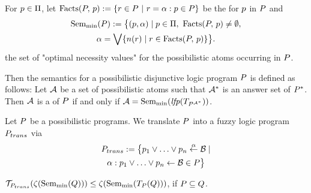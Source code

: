 For $\atom\in\Atoms$, let $\pFacts{\pflp}{\atom}\eqdef\set{\prule\in\pflp \guard \prule = \pnec:\atom \in\pflp}$ be the  for $\atom$ in $\pflp$ and
\begin{multline*}
    \Semmin{\pflp} \eqdef \bigl\{ (\atom,\lelem) \mid \atom\in\Atoms,\ \pFacts{\pflp}{\atom}\neq\emptyset,\\
    \lelem = \biglub\set{\projrule[\prule] \mid \prule\in\pFacts{\pflp}{\atom}} \bigr\}.
\end{multline*}
the set of "optimal necessity values" for the possibilistic atoms occurring in $\pflp$.

Then the semantics for a possibilistic disjunctive logic program $\pflp$ is defined as follows:
Let $\pint$ be a set of possibilistic atoms such that $\proj[\pint]$ is an answer set of $\proj[\pflp]$. Then $\pint$ is a  of $\pflp$ if and only if $\pint = \Semmin{\lfp(\plpop_{\pred{\pflp}{\proj[\pint]}}})$.

Let $\pflp$ be a possibilistic programs. We translate $\pflp$ into a fuzzy logic program $\PosToFuz{\pflp}$ via
\begin{multline*}
    \PosToFuz{\pflp} \eqdef \bigl\{\atom_1\flpor\dots\flpor\atom_n\flpif{\lelem}\body\mid\\
    \lelem : \atom_1\flpor\dots\flpor\atom_n\lpif\body \in \pflp\bigr\}
\end{multline*}
\begin{proposition}
    $\lpap[\PosToFuz{\pflp}](\PintToFint(\Semmin{\pflpalt)})\leq\PintToFint(\Semmin{\plpop_{\pflp}(\pflpalt))}$, if $\pflp\subseteq\pflpalt$.
\end{proposition}


